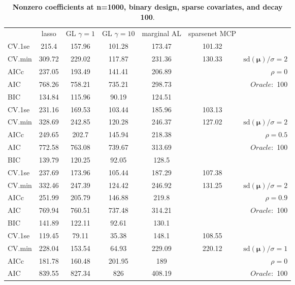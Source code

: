 \clearpage
\begin{table}\vspace{-.5cm}
\caption[l]{ { \bf Nonzero coefficients at n=1000, binary design, 
sparse covariates, and  decay  100}.}
\vspace{-.5cm}
\footnotesize{}
\begin{center}
\begin{tabular}{l*{5}{c}|r}
& lasso & GL $\gamma=1$ & GL $\gamma=10$ & marginal AL & sparsenet MCP  & \\
 \cline{1-7}
CV.1se & 215.4 & 157.96 & 101.28 & 173.47 & 101.32 & \\
CV.min & 309.72 & 229.02 & 117.87 & 231.36 & 130.33 &  $\mathrm{sd}(\mathbf{\mu})/\sigma=2$ \\
AICc & 237.05 & 193.49 & 141.41 & 206.89 & & $\rho=0$ \\
AIC & 768.26 & 758.21 & 735.21 & 298.73 & &  \multirow{2}{*}{$Oracle: $ 100} \\
BIC & 134.84 & 115.96 & 90.19 & 124.51 & &  \\
 \hline 
CV.1se & 231.16 & 169.53 & 103.44 & 185.96 & 103.13 & \\
CV.min & 328.69 & 242.85 & 120.28 & 246.37 & 127.02 &  $\mathrm{sd}(\mathbf{\mu})/\sigma=2$ \\
AICc & 249.65 & 202.7 & 145.94 & 218.38 & & $\rho=0.5$ \\
AIC & 772.58 & 763.08 & 739.67 & 313.69 & &  \multirow{2}{*}{$Oracle: $ 100} \\
BIC & 139.79 & 120.25 & 92.05 & 128.5 & &  \\
 \hline 
CV.1se & 237.69 & 173.96 & 105.44 & 187.29 & 107.38 & \\
CV.min & 332.46 & 247.39 & 124.42 & 246.92 & 131.25 &  $\mathrm{sd}(\mathbf{\mu})/\sigma=2$ \\
AICc & 251.99 & 205.79 & 146.88 & 219.8 & & $\rho=0.9$ \\
AIC & 769.94 & 760.51 & 737.48 & 314.21 & &  \multirow{2}{*}{$Oracle: $ 100} \\
BIC & 141.89 & 122.11 & 92.61 & 130.1 & &  \\
 \hline 
CV.1se & 119.45 & 79.11 & 35.38 & 148.1 & 108.55 & \\
CV.min & 228.04 & 153.54 & 64.93 & 229.09 & 220.12 &  $\mathrm{sd}(\mathbf{\mu})/\sigma=1$ \\
AICc & 181.78 & 160.48 & 201.95 & 189 & & $\rho=0$ \\
AIC & 839.55 & 827.34 & 826 & 408.19 & &  \multirow{2}{*}{$Oracle: $ 100} \\

\end{tabular}
\end{center}
\end{table}
